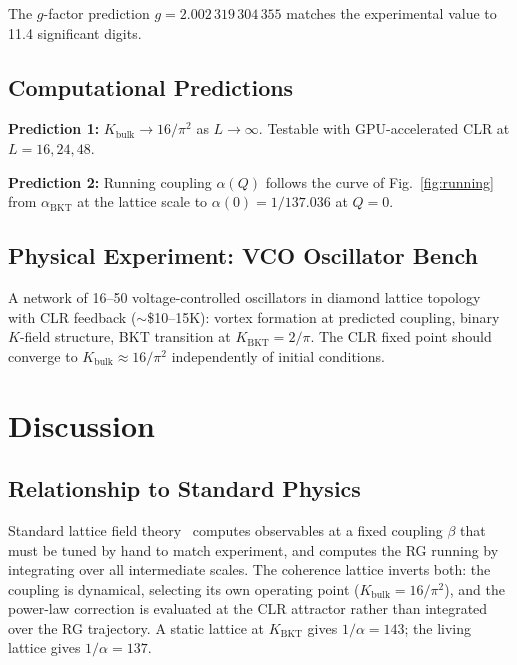 \documentclass[aps,prd,onecolumn,superscriptaddress,floatfix,12pt]{revtex4-2}
\newcommand{\Kbulk}{K_{\text{bulk}}}
\newcommand{\KBKT}{K_{\text{BKT}}}
\newcommand{\alphaBKT}{\alpha_{\text{BKT}}}
\begin{document}
The $g$-factor prediction $g = 2.002\,319\,304\,355$ matches the experimental value to 11.4 significant digits.

\subsection{Computational Predictions}\label{sec:7-2}

\textbf{Prediction 1:} $\Kbulk \to 16/\pi^2$ as $L \to \infty$. Testable with GPU-accelerated CLR at $L = 16, 24, 48$.

\textbf{Prediction 2:} Running coupling $\alpha(Q)$ follows the curve of Fig.~\ref{fig:running} from $\alphaBKT$ at the lattice scale to $\alpha(0) = 1/137.036$ at $Q = 0$.

\subsection{Physical Experiment: VCO Oscillator Bench}\label{sec:7-3}

A network of 16--50 voltage-controlled oscillators in diamond lattice topology with CLR feedback ($\sim$\$10--15K): vortex formation at predicted coupling, binary $K$-field structure, BKT transition at $\KBKT = 2/\pi$. The CLR fixed point should converge to $\Kbulk \approx 16/\pi^2$ independently of initial conditions.

\section{Discussion}\label{sec:8}

\subsection{Relationship to Standard Physics}\label{sec:8-1}

Standard lattice field theory~\cite{Wilson1974} computes observables at a fixed coupling $\beta$ that must be tuned by hand to match experiment, and computes the RG running by integrating over all intermediate scales. The coherence lattice inverts both: the coupling is dynamical, selecting its own operating point ($\Kbulk = 16/\pi^2$), and the power-law correction is evaluated at the CLR attractor rather than integrated over the RG trajectory.  A static lattice at $\KBKT$ gives $1/\alpha = 143$; the living lattice gives $1/\alpha = 137$.
\end{document}
